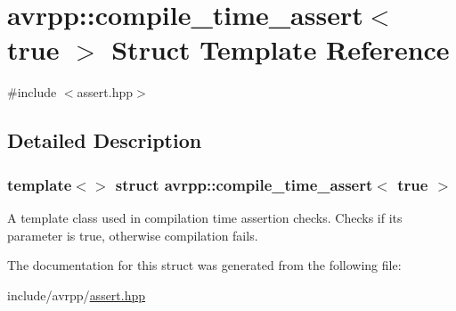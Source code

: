 \hypertarget{structavrpp_1_1compile__time__assert_3_01true_01_4}{
\section{avrpp::compile\_\-time\_\-assert$<$ true $>$ Struct Template Reference}
\label{structavrpp_1_1compile__time__assert_3_01true_01_4}
}


{\ttfamily \#include $<$assert.hpp$>$}



\subsection{Detailed Description}
\subsubsection*{template$<$$>$ struct avrpp::compile\_\-time\_\-assert$<$ true $>$}

A template class used in compilation time assertion checks. Checks if its parameter is true, otherwise compilation fails. 

The documentation for this struct was generated from the following file:\begin{DoxyCompactItemize}
\item 
include/avrpp/\hyperlink{assert_8hpp}{assert.hpp}\end{DoxyCompactItemize}
